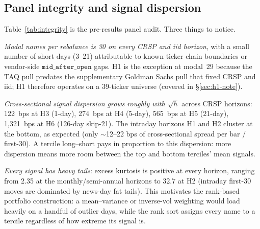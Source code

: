 \documentclass[10pt,conference,compsoc]{IEEEtran}
\begin{document}
\subsection{Panel integrity and signal dispersion}
\label{sec:integrity}

\begin{table}[t]
\centering
\caption{Per-horizon panel integrity and cross-sectional signal
moments. ``Modal $N$'' is the most common number of stocks present
per rebalance (target 30); ``short-days'' counts rebalance dates
with $<$30 names (WRDS data-quality gaps, ticker transitions, and
--- for H1 --- the TAQ pull that is 39 tickers not 40). ``Turn.'' is
the mean per-rebalance turnover. $\bar{s}$ and $\sigma_s$ are the
pooled mean and standard deviation of the signal distribution (bps);
XS-$\sigma_s$ is the mean per-date cross-sectional standard
deviation --- the actual dispersion the tercile sort ranks against.
Kurtosis is \emph{excess} over Gaussian.}
\label{tab:integrity}
\scriptsize

\end{table}

Table~\ref{tab:integrity} is the pre-results panel audit. Three
things to notice.

\emph{Modal names per rebalance is 30 on every CRSP and iid horizon},
with a small number of short days (3--21) attributable to known
ticker-chain boundaries or vendor-side $\texttt{mid\_after\_open}$
gaps. H1 is the exception at modal~29 because the TAQ pull predates
the supplementary Goldman Sachs pull that fixed CRSP and iid; H1
therefore operates on a 39-ticker universe (covered in \S\ref{sec:h1-note}).

\emph{Cross-sectional signal dispersion grows roughly with
$\sqrt{h}$} across CRSP horizons: 122~bps at H3 (1-day),
274~bps at H4 (5-day), 565~bps at H5 (21-day), 1{,}321~bps at H6
(126-day skip-21). The intraday horizons H1 and H2 cluster at the
bottom, as expected (only $\sim$12--22 bps of cross-sectional
spread per bar / first-30). A tercile long--short pays in
proportion to this dispersion: more dispersion means more room
between the top and bottom terciles' mean signals.

\emph{Every signal has heavy tails}: excess kurtosis is positive at
every horizon, ranging from 2.35 at the monthly/semi-annual
horizons to 32.7 at H2 (intraday first-30 moves are dominated by
news-day fat tails). This motivates the rank-based portfolio
construction: a mean--variance or inverse-vol weighting would load
heavily on a handful of outlier days, while the rank sort assigns
every name to a tercile regardless of how extreme its signal is.
\end{document}
